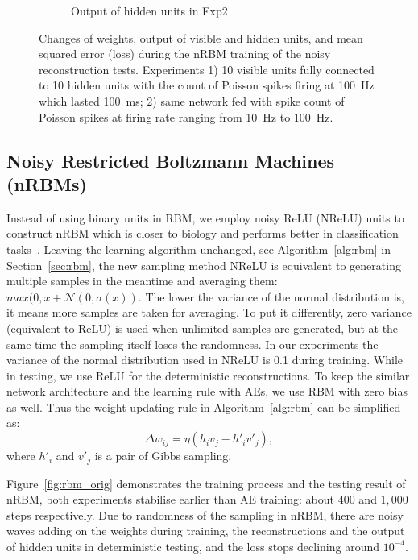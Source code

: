 \begin{figure}
\begin{subfigure}[t]{0.45\textwidth}
		\caption{Output of hidden units in Exp2}
	\end{subfigure}
	\caption{Changes of weights, output of visible and hidden units, and mean squared error (loss) during the nRBM training of the noisy reconstruction tests. 
		Experiments 1) 10 visible units fully connected to 10 hidden units with the count of Poisson spikes firing at 100~Hz which lasted 100~ms; 2) same network fed with spike count of Poisson spikes at firing rate ranging from 10~Hz to 100~Hz.}
	\label{fig:rbm_noise}
\end{figure}

\subsection{Noisy Restricted Boltzmann Machines (nRBMs)}
Instead of using binary units in RBM, we employ noisy ReLU (NReLU) units to construct nRBM which is closer to biology and performs better in classification tasks~\cite{nair2010rectified}.
Leaving the learning algorithm unchanged, see Algorithm~\ref{alg:rbm} in Section~\ref{sec:rbm}, the new sampling method NReLU is equivalent to generating multiple samples in the meantime and averaging them: $max(0, x+\mathcal{N}(0, \sigma(x))$.
The lower the variance of the normal distribution is, it means more samples are taken for averaging.
To put it differently, zero variance (equivalent to ReLU) is used when unlimited samples are generated, but at the same time the sampling itself loses the randomness.
In our experiments the variance of the normal distribution used in NReLU is 0.1 during training.
While in testing, we use ReLU for the deterministic reconstructions. 
To keep the similar network architecture and the learning rule with AEs, we use RBM with zero bias as well.
Thus the weight updating rule in Algorithm~\ref{alg:rbm} can be simplified as:
\begin{equation}
\Delta w_{ij} = \eta (h_iv_j - h'_iv'_j),
\label{equ:rbm}
\end{equation} 
where $h'_i$ and $v'_j$ is a pair of Gibbs sampling.

Figure~\ref{fig:rbm_orig} demonstrates the training process and the testing result of nRBM, both experiments stabilise earlier than AE training: about 400 and $1,000$ steps respectively.
Due to randomness of the sampling in nRBM, there are noisy waves adding on the weights during training, the reconstructions and the output of hidden units in deterministic testing, and the loss stops declining around $10^{-4}$.

